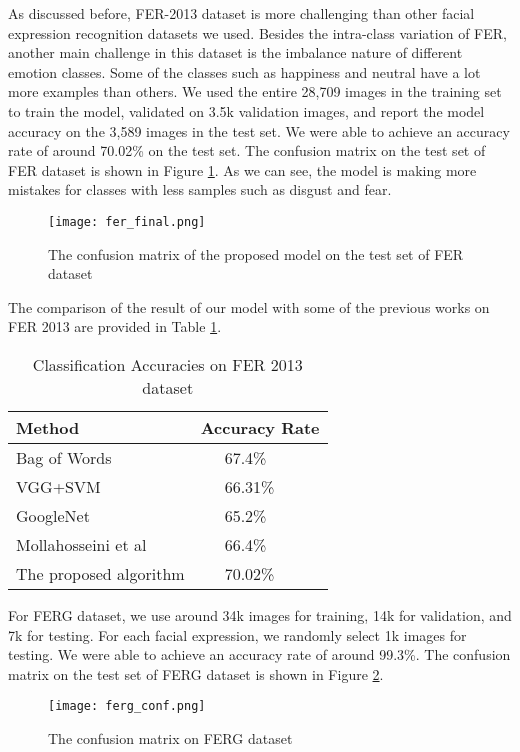 \documentclass[conference]{IEEEtran}
\begin{document}
As discussed before, FER-2013 dataset is more challenging than other facial expression recognition datasets we used. 
Besides the intra-class variation of FER, another main challenge in this dataset is the imbalance nature of different emotion classes. Some of the classes such as happiness and neutral have a lot more examples than others. 
We used the entire 28,709 images in the training set to train the model, validated on 3.5k validation images, and report the model accuracy on the 3,589 images in the test set. 
We were able to achieve an accuracy rate of around 70.02\% on the test set.
The confusion matrix on the test set of FER dataset is shown in Figure \ref{fig:ConfusionFER}. 
As we can see, the model is making more mistakes for classes with less samples such as disgust and fear.
\begin{figure}[h]
\begin{center}
   \texttt{[image: fer\_final.png]}
\end{center}
   \caption{The confusion matrix of the proposed model on the test set of FER dataset}
\label{fig:ConfusionFER}
\end{figure}


The comparison of the result of our model with some of the previous works on FER 2013 are provided in Table \ref{table:FER}.
\begin{table}[h]
\centering
  \caption{Classification Accuracies on FER 2013 dataset}
\begin{tabular}{|m{4cm}|m{2cm}|}
\hline
Method  & Accuracy Rate\\
\hline
Bag of Words \cite{bow}  &  \ \ \ 67.4\%\\
\hline 
VGG+SVM \cite{vggsvm} &   \ \ \  66.31\% \\
\hline 
GoogleNet \cite{googlenet} &   \ \ \  65.2\% \\
\hline 
Mollahosseini et al \cite{mollahosseini2016going} &   \ \ \  66.4\% \\
\hline
 The proposed algorithm  &  \ \ \ 70.02\%\\
\hline
\end{tabular}
\label{table:FER}
\end{table}


For FERG dataset, we use around 34k images for training, 14k for validation, and 7k for testing. For each facial expression, we randomly select 1k images for testing. We were able to achieve an accuracy rate of around 99.3\%.
The confusion matrix on the test set of FERG dataset is shown in Figure \ref{fig:ConfusionFERG}.
\begin{figure}[t]
\begin{center}
   \texttt{[image: ferg\_conf.png]}
\end{center}
   \caption{The confusion matrix on FERG dataset}
\label{fig:ConfusionFERG}
\end{figure}
\end{document}
